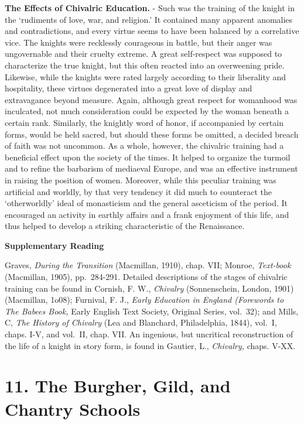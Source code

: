 \documentclass[]{book}
\begin{document}
\textbf{The Effects of Chivalric Education.} - Such was the training of the knight in the `rudiments of love, war, and religion.' It contained many apparent anomalies and contradictions, and every virtue seems to have been balanced by a correlative vice. The knights were recklessly courageous in battle, but their anger was ungovernable and their cruelty extreme. A great self-respect was supposed to characterize the true knight, but this often reacted into an overweening pride. Likewise, while the knights were rated largely according to their liberality and hospitality, these virtues degenerated into a great love of display and extravagance beyond measure. Again, although great respect for womanhood was inculcated, not much consideration could be expected by the woman beneath a certain rank. Similarly, the knightly word of honor, if accompanied by certain forms, would be held sacred, but should these forms be omitted, a decided breach of faith was not uncommon. As a whole, however, the chivalric training had a beneficial effect upon the society of the times. It helped to organize the turmoil and to refine the barbarism of mediaeval Europe, and was an effective instrument in raising the position of women. Moreover, while this peculiar training was artificial and worldly, by that very tendency it did much to counteract the `otherworldly' ideal of monasticism and the general asceticism of the period. It encouraged an activity in earthly affairs and a frank enjoyment of this life, and thus helped to develop a striking characteristic of the Renaissance.

\textbf{Supplementary Reading}

Graves, \emph{During the Transition} (Macmillan, 1910), chap. VII; Monroe, \emph{Text-book} (Macmillan, 1905), pp.~284-291. Detailed descriptions of the stages of chivalric training can be found in Cornish, F. W., \emph{Chivalry} (Sonnenschein, London, 1901) (Macmillan, 1o08); Furnival, F. J., \emph{Early Education in England (Forewords to The Babees Book,} Early English Text Society, Original Series, vol.~32); and Mills, C, \emph{The History of Chivalry} (Lea and Blanchard, Philadelphia, 1844), vol.~I, chaps. I-V, and vol.~II, chap. VII. An ingenious, but uncritical reconstruction of the life of a knight in story form, is found in Gautier, L., \emph{Chivalry,} chaps. V-XX.

\hypertarget{the-burgher-gild-and-chantry-schools}{%
\chapter{11. The Burgher, Gild, and Chantry Schools}\label{the-burgher-gild-and-chantry-schools}}
\end{document}
